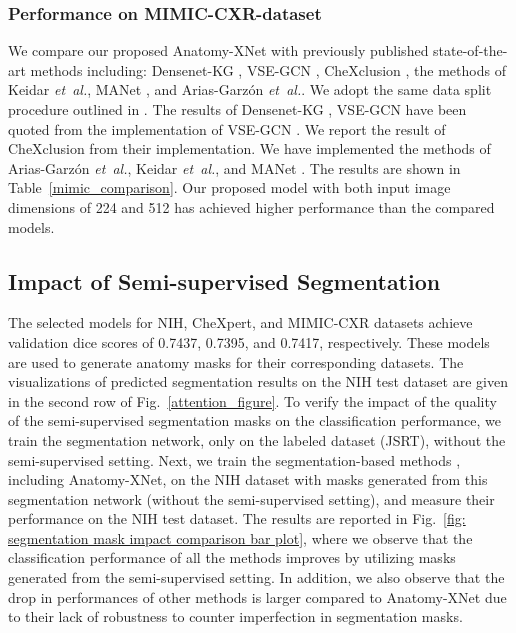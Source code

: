 \documentclass[journal]{IEEEtran}
\newcommand{\etal}{\emph{et~al.}}
\begin{document}
\subsubsection{Performance on MIMIC-CXR-dataset}
We compare our proposed Anatomy-XNet with previously published state-of-the-art methods including: Densenet-KG \cite{Zhang_Wang_Xu_Yu_Yuille_Xu_2020}, VSE-GCN \cite{Hou2021MultiLabelLW}, CheXclusion \cite{SeyyedKalantari2021CheXclusionFG}, the methods of Keidar \etal \cite{Keidar2021}, MANet \cite{XU202196}, and Arias-Garzón \etal \cite{ARIASGARZON2021100138}. We adopt the same data split procedure outlined in \cite{SeyyedKalantari2021CheXclusionFG}. The results of Densenet-KG \cite{Zhang_Wang_Xu_Yu_Yuille_Xu_2020}, VSE-GCN \cite{Hou2021MultiLabelLW} have been quoted from the implementation of VSE-GCN \cite{Hou2021MultiLabelLW}. We report the result of  CheXclusion \cite{SeyyedKalantari2021CheXclusionFG} from their implementation. We have implemented the methods of Arias-Garzón \etal \cite{ARIASGARZON2021100138}, Keidar \etal \cite{Keidar2021}, and MANet \cite{XU202196}. The results are shown in Table~\ref{mimic_comparison}. Our proposed model with both input image dimensions of 224 and 512 has achieved higher performance than the compared models.

\subsection{Impact of Semi-supervised Segmentation}
The selected models for NIH, CheXpert, and MIMIC-CXR datasets achieve validation dice scores of 0.7437, 0.7395, and 0.7417, respectively. These models are used to generate anatomy masks for their corresponding datasets. The visualizations of predicted segmentation results on the NIH test dataset are given in the second row of Fig.~\ref{attention_figure}. To verify the impact of the quality of the semi-supervised segmentation masks on the classification performance, we train the segmentation network, only on the labeled dataset (JSRT), without the semi-supervised setting. Next, we train the segmentation-based methods \cite{Keidar2021, XU202196, ARIASGARZON2021100138}, including Anatomy-XNet, on the NIH dataset with masks generated from this segmentation network (without the semi-supervised setting), and measure their performance on the NIH test dataset. The results are reported in Fig.~\ref{fig: segmentation mask impact comparison bar plot}, where we observe that the classification performance of all the methods improves by utilizing masks generated from the semi-supervised setting. In addition, we also observe that the drop in performances of other methods \cite{Keidar2021, XU202196, ARIASGARZON2021100138} is larger compared to Anatomy-XNet due to their lack of robustness to counter imperfection in segmentation masks.
\end{document}
